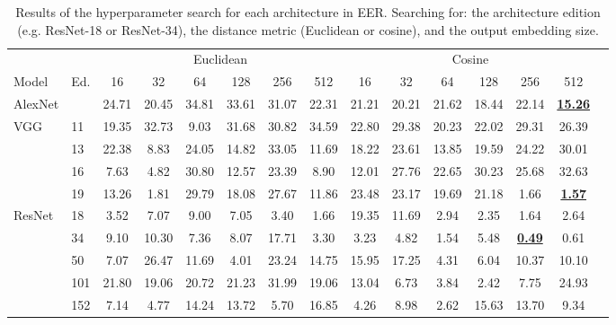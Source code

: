 \begin{table}[t!]
    \centering
    \caption{Results of the hyperparameter search for each architecture in \gls{EER}. Searching for: the architecture edition (e.g. ResNet-18 or ResNet-34), the distance metric (Euclidean or cosine), and the output embedding size.}
    \label{tab:tuning_raw}
    \setlength{\tabcolsep}{4pt}
    \footnotesize
    \begin{tabular}{llcccccc|ccccccc}
        \toprule
        & & \multicolumn{6}{c}{Euclidean} & \multicolumn{6}{c}{Cosine} \\
        \cmidrule(lr){3-8} \cmidrule(lr){9-14}
        Model & Ed. & 16 & 32 & 64 & 128 & 256 & 512 & 16 & 32 & 64 & 128 & 256 & 512 \\
        \midrule
        AlexNet                 &   & 24.71 & 20.45 & 34.81 & 33.61 & 31.07 & 22.31 & 21.21 & 20.21 & 21.62 & 18.44 & 22.14 & \underline{\textbf{15.26}} \\
        \midrule
        \multirow{4}{*}{VGG}    & 11    & 19.35 & 32.73 & 9.03 & 31.68 & 30.82 & 34.59 & 22.80 & 29.38 & 20.23 & 22.02 & 29.31 & 26.39 \\
                                & 13    & 22.38 & 8.83 & 24.05 & 14.82 & 33.05 & 11.69 & 18.22 & 23.61 & 13.85 & 19.59 & 24.22 & 30.01 \\
                                & 16    & 7.63 & 4.82 & 30.80 & 12.57 & 23.39 & 8.90 & 12.01 & 27.76 & 22.65 & 30.23 & 25.68 & 32.63 \\
                                & 19    & 13.26 & 1.81 & 29.79 & 18.08 & 27.67 & 11.86 & 23.48 & 23.17 & 19.69 & 21.18 & 1.66 & \underline{\textbf{1.57}} \\
        \midrule
        \multirow{5}{*}{ResNet} & 18    & 3.52 & 7.07 & 9.00 & 7.05 & 3.40 & 1.66 & 19.35 & 11.69 & 2.94 & 2.35 & 1.64 & 2.64 \\
                                & 34    & 9.10 & 10.30 & 7.36 & 8.07 & 17.71 & 3.30 & 3.23 & 4.82 & 1.54 & 5.48 & \underline{\textbf{0.49}} & 0.61 \\
                                & 50    & 7.07 & 26.47 & 11.69 & 4.01 & 23.24 & 14.75 & 15.95 & 17.25 & 4.31 & 6.04 & 10.37 & 10.10 \\
                                & 101   & 21.80 & 19.06 & 20.72 & 21.23 & 31.99 & 19.06 & 13.04 & 6.73 & 3.84 & 2.42 & 7.75 & 24.93 \\
                                & 152   & 7.14 & 4.77 & 14.24 & 13.72 & 5.70 & 16.85 & 4.26 & 8.98 & 2.62 & 15.63 & 13.70 & 9.34 \\

\end{tabular}
\end{table}
